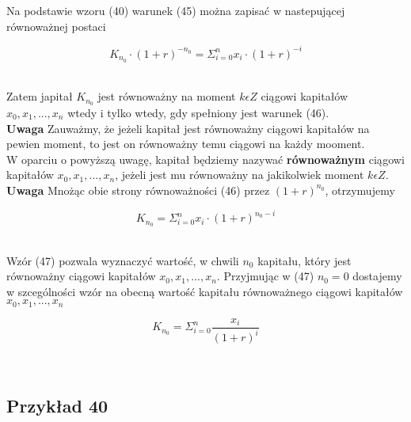 \documentclass{article}
\begin{document}
Na podstawie wzoru (40) warunek (45) można zapisać w nastepującej równoważnej postaci 

\begin{center}
	\begin{equation}
		K_n_0 \cdot (1 + r)^{-n_0} = \Sigma ^n_{i=0}x_i \cdot (1 + r)^{-i}
	\end{equation}
\end{center}\\

Zatem japitał $K_n_0$ jest równoważny na moment $ k \epsilon Z $ ciągowi kapitałów $ x_0, x_1, ..., x_n $ wtedy i tylko wtedy, gdy spełniony jest warunek (46).\\

\textbf{Uwaga} Zauważmy, że jeżeli kapitał jest równoważny ciągowi kapitałów na pewien moment, to jest on równoważny temu ciągowi na każdy mooment.\\

W oparciu o powyższą uwagę, kapitał będziemy nazywać \textbf{równoważnym} ciągowi kapitałów $ x_0, x_1, ..., x_n $, jeżeli jest mu równoważny na jakikolwiek moment $ k \epsilon Z $.\\

\textbf{Uwaga} Mnożąc obie strony równoważności (46) przez $ (1+r)^{n_0} $, otrzymujemy 

\begin{center}
	\begin{equation}
		K_n_0 = \Sigma ^n_{i=0} x_i \cdot (1 + r)^{n_0 - i}
	\end{equation}
\end{center}\\

Wzór (47) pozwala wyznaczyć wartość, w chwili $ n_0 $ kapitału, który jest równoważny ciągowi kapitałów $ x_0, x_1, ..., x_n $. Przyjmując w (47) $ n_0 = 0 $ dostajemy w szcególności wzór na obecną wartość kapitału równoważnego ciągowi kapitałów $ x_0, x_1, ..., x_n $

\begin{center}
	\begin{equation}
		K_n_0 = \Sigma ^n_{i=0} \frac{x_i}{(1 + r)^i}
	\end{equation}
\end{center}\\

\subsection{Przykład 40}
\end{document}
